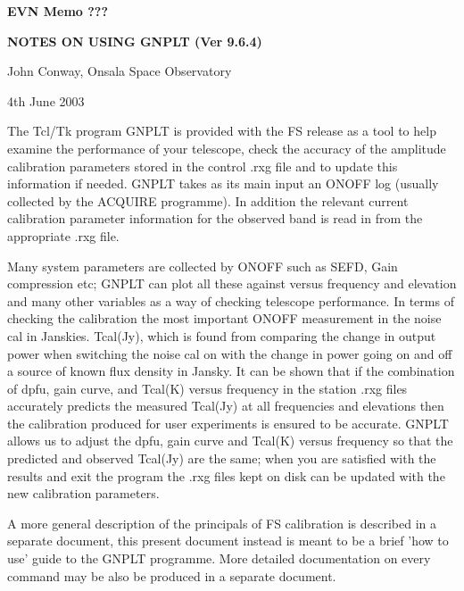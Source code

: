 \topmargin 0in
\textheight 8.5in
\oddsidemargin 0in
\textwidth 6.1in





\centerline{\large \bf EVN Memo ??? }
\vskip 0.4cm
\centerline{\large \bf NOTES ON USING GNPLT (Ver 9.6.4)}
\vskip 0.4cm
\centerline{ John Conway, Onsala Space Observatory}
\vskip 0.4cm
\centerline{ 4th June 2003}
\noindent
\vskip 2cm

\vskip 0.5cm

  The Tcl/Tk program GNPLT is provided with the FS release 
  as a tool to help examine the performance 
  of your telescope, check the accuracy of the amplitude 
  calibration parameters stored in the control .rxg file 
  and to  update  this information if needed. GNPLT  takes as its main   
  input an ONOFF log (usually collected by the ACQUIRE 
  programme). In addition the relevant current calibration parameter information
  for the observed band is read in from the appropriate .rxg file. 
   
  Many system parameters are collected by 
  ONOFF such as SEFD, Gain compression etc; GNPLT can plot all these against versus
  frequency and elevation and many other variables as a way of checking
  telescope  performance.  In terms of checking the calibration 
  the most important ONOFF measurement in the noise cal in Janskies.
  Tcal(Jy), which is found from comparing the change in 
  output power when switching the noise cal on with the change in power
  going on and off a source of known flux density in Jansky. 
  It can be shown that if the combination of dpfu, gain curve,
  and Tcal(K) versus frequency in the station .rxg files accurately 
  predicts the measured Tcal(Jy) at all frequencies and elevations then the 
  calibration produced for user experiments is ensured to be accurate.
  GNPLT allows us to adjust the dpfu, gain curve and  Tcal(K) versus frequency 
  so that the predicted and observed Tcal(Jy) are the same; when you are
  satisfied with the results and exit the program the .rxg files kept on 
  disk can be updated with the new calibration parameters.
  

  A more general description of the principals of FS calibration is described 
  in a separate  document, this present document instead is meant to be a brief 'how
  to use' guide to the GNPLT programme. More detailed documentation on every
  command may be also be produced in a separate document.

